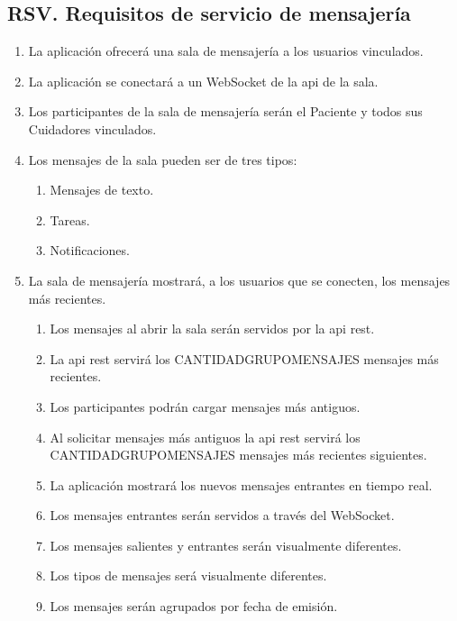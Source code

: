 \subsection{RSV. Requisitos de servicio de mensajería}

\begin{enumerate}[label*=RSV \arabic*.]
    \item La aplicación ofrecerá una sala de mensajería a los usuarios vinculados.
    \item La aplicación se conectará a un WebSocket de la \acrshort{api} de la sala.
    \item Los participantes de la sala de mensajería serán el Paciente y todos sus Cuidadores vinculados.
    \item Los mensajes de la sala pueden ser de tres tipos:
    \begin{enumerate}[label*=\arabic*.]
        \item Mensajes de texto.
        \item Tareas.
        \item Notificaciones.
    \end{enumerate}
    \item \label{req:listar_mensaje} La sala de mensajería mostrará, a los usuarios que se conecten, los mensajes más recientes.
    \begin{enumerate}[label*=\arabic*.]
        \item Los mensajes al abrir la sala serán servidos por la \acrshort{api} \acrshort{rest}.
        \item La \acrshort{api} \acrshort{rest} servirá los CANTIDAD\textunderscore GRUPO\textunderscore MENSAJES mensajes más recientes.
        \item Los participantes podrán cargar mensajes más antiguos.
        \item Al solicitar mensajes más antiguos la \acrshort{api} \acrshort{rest} servirá los CANTIDAD\textunderscore GRUPO\textunderscore MENSAJES mensajes más recientes siguientes.
        \item La aplicación mostrará los nuevos mensajes entrantes en tiempo real.
        \item Los mensajes entrantes serán servidos a través del WebSocket.
        \item Los mensajes salientes y entrantes serán visualmente diferentes.
        \item Los tipos de mensajes será visualmente diferentes.
        \item Los mensajes serán agrupados por fecha de emisión.

\end{enumerate}
\end{enumerate}
